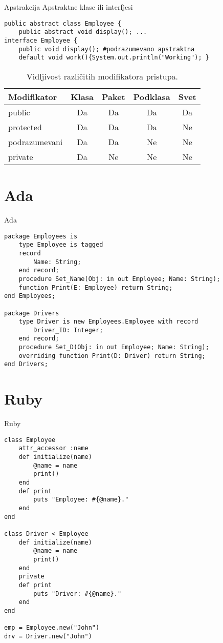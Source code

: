 \documentclass[14pt,aspectratio=169]{beamer}
\begin{document}
\begin{frame}[fragile]{Apstrakcija}
Apstraktne klase ili interfjesi
\begin{lstlisting}
public abstract class Employee {
	public abstract void display(); ...
interface Employee {
	public void display(); #podrazumevano apstraktna
	default void work(){System.out.println("Working"); }
\end{lstlisting}
\begin{table}
\begin{center}
\caption{Vidljivost različitih modifikatora pristupa.}
\begin{tabular}{|l|c|c|c|c|} \hline
Modifikator &Klasa &Paket &Podklasa &Svet\\ \hline
public &Da &Da &Da &Da\\ \hline
protected &Da &Da &Da &Ne\\ \hline
podrazumevani &Da &Da &Ne &Ne\\ \hline
private &Da &Ne &Ne &Ne\\ \hline
\end{tabular}
\label{tab:tabelaModPristupa}
\end{center}
\end{table}
\end{frame}

\section{Ada}
\begin{frame}[fragile]{Ada}
\begin{lstlisting}[frame=single, label=lst:adaDeklaracija]
package Employees is 
	type Employee is tagged 
	record
		Name: String;
	end record;
	procedure Set_Name(Obj: in out Employee; Name: String);
	function Print(E: Employee) return String;
end Employees;

package Drivers
	type Driver is new Employees.Employee with record
		Driver_ID: Integer;
	end record;
	procedure Set_D(Obj: in out Employee; Name: String);
	overriding function Print(D: Driver) return String;
end Drivers;
\end{lstlisting}
\end{frame}

\section{Ruby}
\begin{frame}[fragile]{Ruby}
\begin{lstlisting}[frame=single, label=lst:rubyDeklaracija]
class Employee
	attr_accessor :name
	def initialize(name)
		@name = name
		print()
	end
	def print
		puts "Employee: #{@name}."
	end
end

class Driver < Employee
	def initialize(name)
		@name = name
		print()
	end
	private
	def print
		puts "Driver: #{@name}."
	end
end

emp = Employee.new("John")
drv = Driver.new("John")
\end{lstlisting}
\end{frame}
\end{document}
